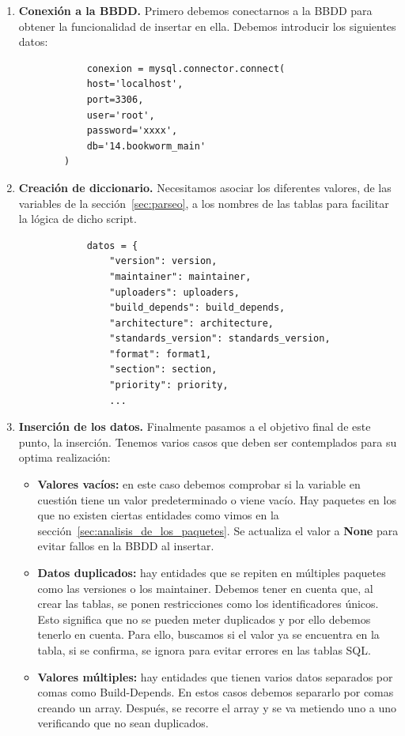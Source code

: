 \documentclass[a4paper, 12pt]{book}
\begin{document}
\begin{enumerate}
		\item \textbf{Conexión a la BBDD.} Primero debemos conectarnos a la BBDD para obtener la funcionalidad de insertar en ella. Debemos introducir los siguientes datos:
		\begin{verbatim}
			conexion = mysql.connector.connect(
			host='localhost',
			port=3306,
			user='root',
			password='xxxx',
			db='14.bookworm_main'
		)
		\end{verbatim} 
		
		\item \textbf{Creación de diccionario.} Necesitamos asociar los diferentes valores, de las variables de la sección~\ref{sec:parseo}, a los nombres de las tablas para facilitar la lógica de dicho script.
		\begin{verbatim}
			datos = {
				"version": version,
				"maintainer": maintainer,
				"uploaders": uploaders,
				"build_depends": build_depends,
				"architecture": architecture,
				"standards_version": standards_version,
				"format": format1,
				"section": section,
				"priority": priority,
				...
		\end{verbatim} 
		
		\item \textbf{Inserción de los datos.} Finalmente pasamos a el objetivo final de este punto, la inserción. Tenemos varios casos que deben ser contemplados para su optima realización:
		
		\begin{itemize}
			\item \textbf{Valores vacíos:} en este caso debemos comprobar si la variable en cuestión tiene un valor predeterminado o viene vacío. Hay paquetes en los que no existen ciertas entidades como vimos en la sección~\ref{sec:analisis_de_los_paquetes}. Se actualiza el valor a \textbf{None} para evitar fallos en la BBDD al insertar.
			
			\item \textbf{Datos duplicados: } hay entidades que se repiten en múltiples paquetes como las versiones o los maintainer. Debemos tener en cuenta que, al crear las tablas, se ponen restricciones como los identificadores únicos. Esto significa que no se pueden meter duplicados y por ello debemos tenerlo en cuenta. Para ello, buscamos si el valor ya se encuentra en la tabla, si se confirma, se ignora para evitar errores en las tablas SQL.
			
			\item \textbf{Valores múltiples: } hay entidades que tienen varios datos separados por comas como Build-Depends. En estos casos debemos separarlo por comas creando un array. Después, se recorre el array y se va metiendo uno a uno verificando que no sean duplicados.
			

\end{itemize}
\end{enumerate}
\end{document}
